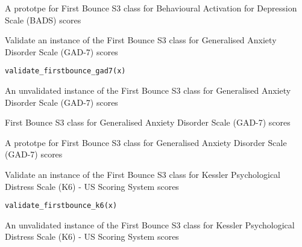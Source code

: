 \documentclass[a4paper]{book}
\begin{document}
%
\begin{Value}
A prototpe for First Bounce S3 class for Behavioural Activation for Depression Scale (BADS) scores
\end{Value}
%
\begin{Description}\relax
Validate an instance of the First Bounce S3 class for Generalised Anxiety Disorder Scale (GAD-7) scores
\end{Description}
%
\begin{Usage}
\begin{verbatim}
validate_firstbounce_gad7(x)
\end{verbatim}
\end{Usage}
%
\begin{Arguments}
\begin{ldescription}
\item[\code{x}] An unvalidated instance of the First Bounce S3 class for Generalised Anxiety Disorder Scale (GAD-7) scores
\end{ldescription}
\end{Arguments}
%
\begin{Details}\relax
First Bounce S3 class for Generalised Anxiety Disorder Scale (GAD-7) scores
\end{Details}
%
\begin{Value}
A prototpe for First Bounce S3 class for Generalised Anxiety Disorder Scale (GAD-7) scores
\end{Value}
%
\begin{Description}\relax
Validate an instance of the First Bounce S3 class for Kessler Psychological Distress Scale (K6) - US Scoring System scores
\end{Description}
%
\begin{Usage}
\begin{verbatim}
validate_firstbounce_k6(x)
\end{verbatim}
\end{Usage}
%
\begin{Arguments}
\begin{ldescription}
\item[\code{x}] An unvalidated instance of the First Bounce S3 class for Kessler Psychological Distress Scale (K6) - US Scoring System scores
\end{ldescription}
\end{Arguments}
\end{document}
